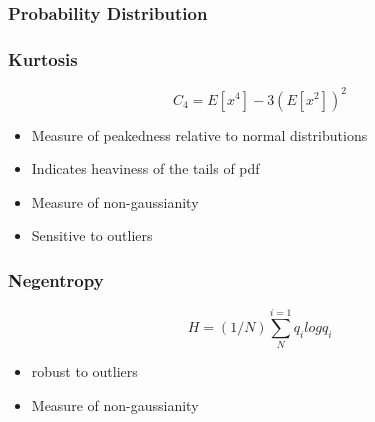 \begin{frame} \frametitle{Probability Distribution}
\end{frame}
\begin{frame} \frametitle{Kurtosis}

   \begin{equation} 
      C_4 = E[x^4] - 3(E[x^2])^2 
   \end{equation}
  \begin{itemize} 
    \item Measure of peakedness relative to normal distributions
    \item Indicates heaviness of the tails of pdf 
    \item Measure of non-gaussianity 
    \item Sensitive to outliers 
  \end{itemize}
\end{frame}
\begin{frame} \frametitle{Negentropy}

   \begin{equation} 
      H =(1/N) \sum_{N}^{i=1} q_i log q_i
   \end{equation}
  \begin{itemize} 
    \item robust to outliers
    \item Measure of non-gaussianity 
  \end{itemize}
\end{frame}
\begin{frame} 
   {}
\end{frame}

